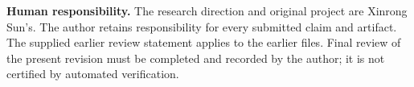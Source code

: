 \textbf{Human responsibility.} The research direction and original project are Xinrong Sun's. The author retains responsibility for every submitted claim and artifact. The supplied earlier review statement applies to the earlier files. Final review of the present revision must be completed and recorded by the author; it is not certified by automated verification.
